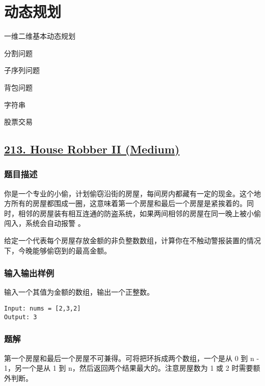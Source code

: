 \documentclass[lang=cn,10pt]{elegantbook}
\begin{document}
\chapter{动态规划}

\begin{introduction}[前情提要]
	\item 一维二维基本动态规划
	\item 分割问题
	\item 子序列问题
	\item 背包问题
	\item 字符串
	\item 股票交易
\end{introduction}

{\color{red}\section{\href{https://leetcode.cn/problems/house-robber-ii/}{213. House Robber II (Medium)}}} \label{ch7.213}

\subsection*{题目描述}

你是一个专业的小偷，计划偷窃沿街的房屋，每间房内都藏有一定的现金。这个地方所有的房屋都围成一圈，这意味着第一个房屋和最后一个房屋是紧挨着的。同时，相邻的房屋装有相互连通的防盗系统，如果两间相邻的房屋在同一晚上被小偷闯入，系统会自动报警 。

给定一个代表每个房屋存放金额的非负整数数组，计算你在不触动警报装置的情况下，今晚能够偷窃到的最高金额。

\subsection*{输入输出样例}

输入一个其值为金额的数组，输出一个正整数。

\begin{lstlisting}
Input: nums = [2,3,2]
Output: 3
\end{lstlisting}

\subsection*{题解}

第一个房屋和最后一个房屋不可兼得。可将把环拆成两个数组，一个是从 0 到 n - 1，另一个是从 1 到 n，然后返回两个结果最大的。注意房屋数为 1 或 2 时需要额外判断。
\end{document}
